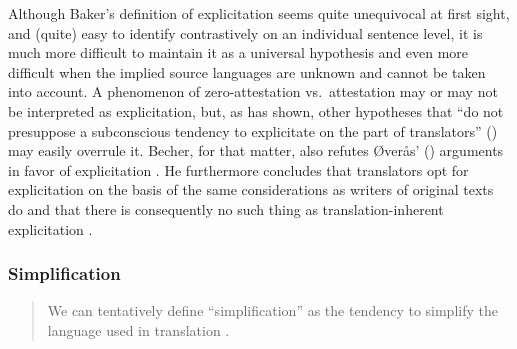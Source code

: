 Although Baker’s definition of explicitation seems quite unequivocal at first sight, and (quite) easy to identify contrastively on an individual sentence level, it is much more difficult to maintain it as a universal hypothesis and even more difficult when the implied source languages are unknown and cannot be taken into account. A phenomenon of zero-attestation vs.\ attestation may or may not be interpreted as explicitation, but, as \citet{becher_abandoning_2010} has shown, other hypotheses that “do not presuppose a subconscious tendency to explicitate on the part of translators” (\citeyear[11]{becher_abandoning_2010}) may easily overrule it. Becher, for that matter, also refutes Øverås’ (\citeyear{overas_search_1998}) arguments in favor of explicitation \citep[12--16]{becher_abandoning_2010}. He furthermore concludes that translators opt for explicitation on the basis of the same considerations as writers of original texts do and that there is consequently no such thing as translation-inherent explicitation \citep[22--23]{becher_abandoning_2010}.

\subsubsection{Simplification}
\label{sec:2.2.2.2}  
\begin{quote}
We can tentatively define “simplification” as the tendency to simplify the language used in translation \citep[181]{baker_corpus-based_1996}.
\end{quote}

